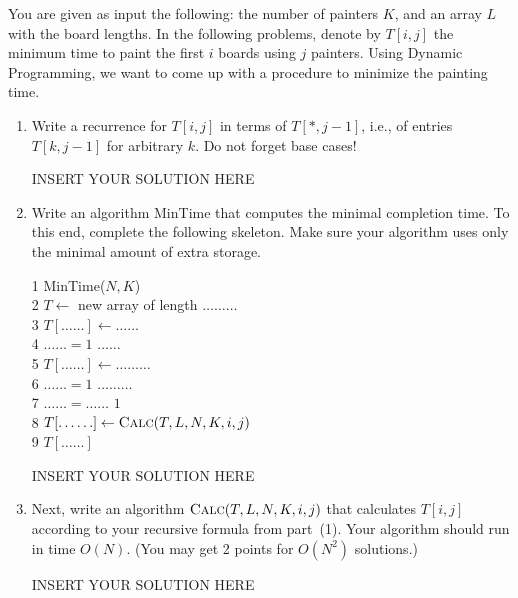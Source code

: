 You are given as input the following: the number of painters $K$, and
an array $L$ with the board lengths.  In the following problems,
denote by $T[i,j]$ the minimum time to paint the first $i$ boards using
$j$ painters. Using Dynamic Programming, we want to come up with a procedure 
to minimize the painting time.
\begin{enumerate}
    \item Write a recurrence for $T[i,j]$ in terms of $T[*, j-1]$, i.e., of entries $T[k,j-1]$ for arbitrary $k$. Do not forget base cases! 
	
\begin{solution}   INSERT YOUR SOLUTION HERE   \end{solution}

	
    \item Write an algorithm {\sc MinTime} that computes the minimal completion time. To this end, complete the following skeleton. Make sure your algorithm uses only the minimal amount of extra storage.
	
    \begin{code}
        1 {\sc MinTime}($N,K$)\\
        2 \> $T \gets $ new array of length $\ldots\ldots\ldots$ \\
        3 \> $T[\ldots\ldots] \gets \ldots\ldots$ \\
        4 \> \For $\ldots\ldots=1$ \To $\ldots\ldots$ \Do \\
        5 \> \> $T[\ldots\ldots] \gets \ldots\ldots\ldots$ \\
        6 \> \For $\ldots\ldots=1$ \To $\ldots\ldots\ldots$ \Do \\
        7 \> \> \For $\ldots\ldots=\ldots\ldots$ \DownTo $1$ \Do \\
        8 \> \> \>  $T[\ldots\ldots] \gets \text{\sc Calc}(T,L,N,K,i,j)$ \\
        9 \> \Return $T[\ldots\ldots]$
    \end{code}

\begin{solution}   INSERT YOUR SOLUTION HERE   \end{solution}

    \item Next, write an algorithm $\text{\sc Calc}(T,L,N,K,i,j)$ that calculates $T[i,j]$
    according to your recursive formula from part~(1). Your algorithm should run in time $O(N)$. (You may get 2 points for $O(N^2)$ solutions.)

\begin{solution}   INSERT YOUR SOLUTION HERE   \end{solution}

\end{enumerate}